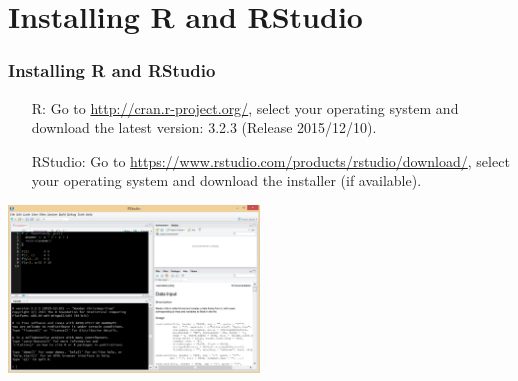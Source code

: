\section{Installing R and RStudio}
\begin{frame}
  \frametitle{Installing R and RStudio}
  		\vspace{-5pt}
        \begin{enumerate}
           \item[R:] Go to \small \url{http://cran.r-project.org/}, select your operating system and download the latest version: 3.2.3 (Release 2015/12/10).
           \item[RStudio:] Go to \small \url{https://www.rstudio.com/products/rstudio/download/}, select your operating system and download the installer (if available).
        \end{enumerate}
%
		\vspace{-5pt}
       \begin{center}
         \includegraphics[width=0.5\textwidth]{images/Rwindow.png}
        \end{center}
\end{frame}


